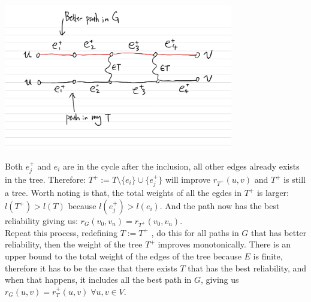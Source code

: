 \documentclass[]{article}
\theoremstyle{definition}
\begin{document}
    \begin{center}
        \includegraphics[width=10cm]{1.11.jpeg}    
    \end{center}
    Both $e_j^+$ and $e_i$ are in the cycle after the inclusion, all other edges already exists in the tree. Therefore: $T^+:= T\setminus \{e_i\}\cup \{e_j^+\}$ will improve $r_{T^+}(u, v)$ and $T^+$ is still a tree. Worth noting is that, the total weights of all the egdes in $T^+$ is larger: $l(T^+) > l(T)$ because $l(e_j^+) > l(e_i)$. And the path now has the best reliability giving us: $r_G(v_0, v_n) = r_{T^+}(v_0, v_n)$. 
    \\
    Repeat this process, redefining $T := T^+$ , do this for all paths in $G$ that has better reliability, then the weight of the tree $T^+$ improves monotonically. There is an upper bound to the total weight of the edges of the tree because $E$ is finite, therefore it has to be the case that there exists $T$ that has the best reliability, and when that happens, it includes all the best path in $G$, giving us $r_G(u, v) = r_T^+(u, v)\;\forall u, v \in V$. 
\end{document}
